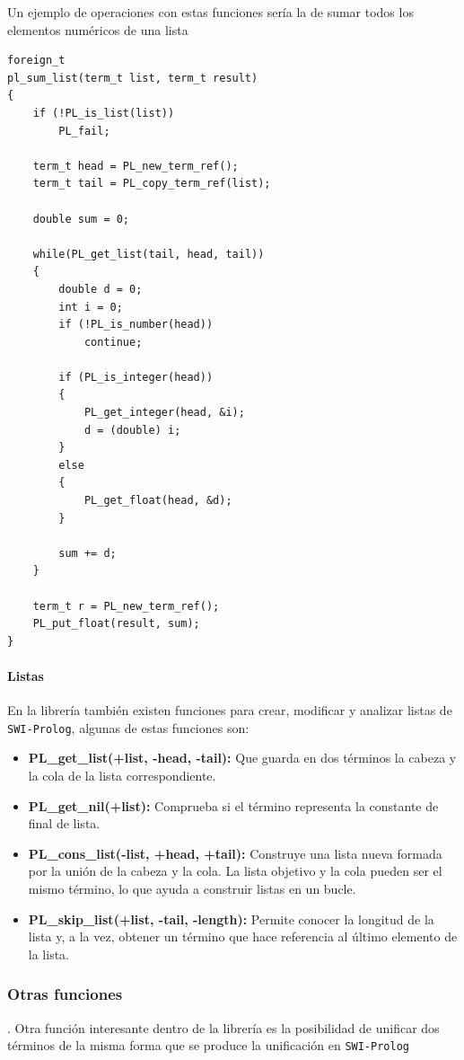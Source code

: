 \documentclass[a4paper]{article}
\begin{document}
Un ejemplo de operaciones con estas funciones sería la de sumar todos los elementos numéricos de una lista

\begin{lstlisting}[style=C++]
foreign_t
pl_sum_list(term_t list, term_t result)
{
	if (!PL_is_list(list))
		PL_fail;
	
	term_t head = PL_new_term_ref();
	term_t tail = PL_copy_term_ref(list);
	
	double sum = 0;
	
	while(PL_get_list(tail, head, tail))
	{
		double d = 0;
		int i = 0;
		if (!PL_is_number(head))
			continue;
		
		if (PL_is_integer(head))
		{
			PL_get_integer(head, &i);
			d = (double) i;
		}
		else
		{
			PL_get_float(head, &d);
		}
		
		sum += d;
	}
	
	term_t r = PL_new_term_ref();
	PL_put_float(result, sum);
}
\end{lstlisting}

\paragraph{Listas}
En la librería también existen funciones para crear, modificar y analizar listas de \texttt{SWI-Prolog}, algunas de estas funciones son:
\begin{itemize}
	\item \textbf{PL\_get\_list(+list, -head, -tail):} Que guarda en dos términos la cabeza y la cola de la lista correspondiente.
	\item \textbf{PL\_get\_nil(+list):} Comprueba si el término representa la constante de final de lista.
	\item \textbf{PL\_cons\_list(-list, +head, +tail):} Construye una lista nueva formada por la unión de la cabeza y la cola. La lista objetivo y la cola pueden ser el mismo término, lo que ayuda a construir listas en un bucle.
	\item \textbf{PL\_skip\_list(+list, -tail, -length):} Permite conocer la longitud de la lista y, a la vez, obtener un término que hace referencia al último elemento de la lista.
\end{itemize}

\subsubsection{Otras funciones}.
Otra función interesante dentro de la librería es la posibilidad de unificar dos términos de la misma forma que se produce la unificación en \texttt{SWI-Prolog}
\end{document}

